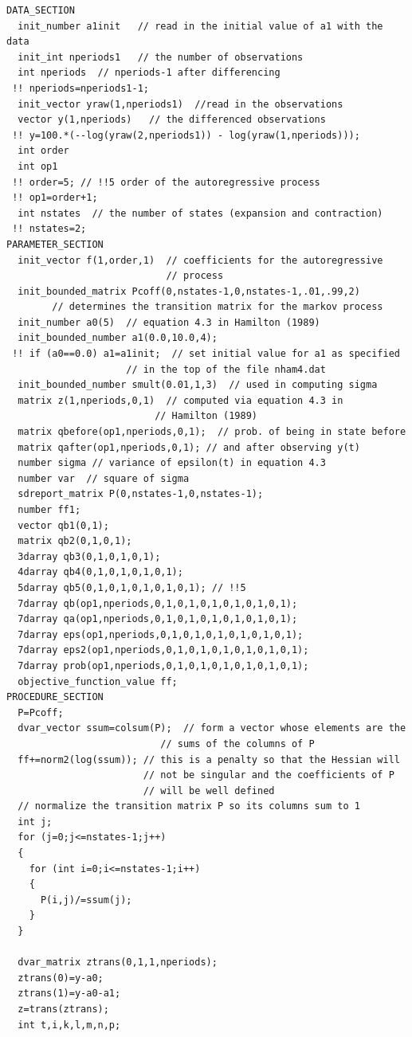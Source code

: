 \documentclass{admbmanual}
\begin{document}
\begin{lstlisting}
DATA_SECTION
  init_number a1init   // read in the initial value of a1 with the data
  init_int nperiods1   // the number of observations
  int nperiods  // nperiods-1 after differencing
 !! nperiods=nperiods1-1;
  init_vector yraw(1,nperiods1)  //read in the observations
  vector y(1,nperiods)   // the differenced observations
 !! y=100.*(--log(yraw(2,nperiods1)) - log(yraw(1,nperiods)));
  int order
  int op1
 !! order=5; // !!5 order of the autoregressive process
 !! op1=order+1;
  int nstates  // the number of states (expansion and contraction)
 !! nstates=2;
PARAMETER_SECTION
  init_vector f(1,order,1)  // coefficients for the autoregressive
                            // process
  init_bounded_matrix Pcoff(0,nstates-1,0,nstates-1,.01,.99,2)
        // determines the transition matrix for the markov process
  init_number a0(5)  // equation 4.3 in Hamilton (1989)
  init_bounded_number a1(0.0,10.0,4);
 !! if (a0==0.0) a1=a1init;  // set initial value for a1 as specified
                     // in the top of the file nham4.dat
  init_bounded_number smult(0.01,1,3)  // used in computing sigma
  matrix z(1,nperiods,0,1)  // computed via equation 4.3 in
                          // Hamilton (1989)
  matrix qbefore(op1,nperiods,0,1);  // prob. of being in state before
  matrix qafter(op1,nperiods,0,1); // and after observing y(t)
  number sigma // variance of epsilon(t) in equation 4.3
  number var  // square of sigma
  sdreport_matrix P(0,nstates-1,0,nstates-1);
  number ff1;
  vector qb1(0,1);
  matrix qb2(0,1,0,1);
  3darray qb3(0,1,0,1,0,1);
  4darray qb4(0,1,0,1,0,1,0,1);
  5darray qb5(0,1,0,1,0,1,0,1,0,1); // !!5
  7darray qb(op1,nperiods,0,1,0,1,0,1,0,1,0,1,0,1);
  7darray qa(op1,nperiods,0,1,0,1,0,1,0,1,0,1,0,1);
  7darray eps(op1,nperiods,0,1,0,1,0,1,0,1,0,1,0,1);
  7darray eps2(op1,nperiods,0,1,0,1,0,1,0,1,0,1,0,1);
  7darray prob(op1,nperiods,0,1,0,1,0,1,0,1,0,1,0,1);
  objective_function_value ff;
PROCEDURE_SECTION
  P=Pcoff;
  dvar_vector ssum=colsum(P);  // form a vector whose elements are the
                           // sums of the columns of P
  ff+=norm2(log(ssum)); // this is a penalty so that the Hessian will
                        // not be singular and the coefficients of P
                        // will be well defined
  // normalize the transition matrix P so its columns sum to 1
  int j;
  for (j=0;j<=nstates-1;j++)
  {
    for (int i=0;i<=nstates-1;i++)
    {
      P(i,j)/=ssum(j);
    }
  }

  dvar_matrix ztrans(0,1,1,nperiods);
  ztrans(0)=y-a0;
  ztrans(1)=y-a0-a1;
  z=trans(ztrans);
  int t,i,k,l,m,n,p;


\end{lstlisting}
\end{document}
